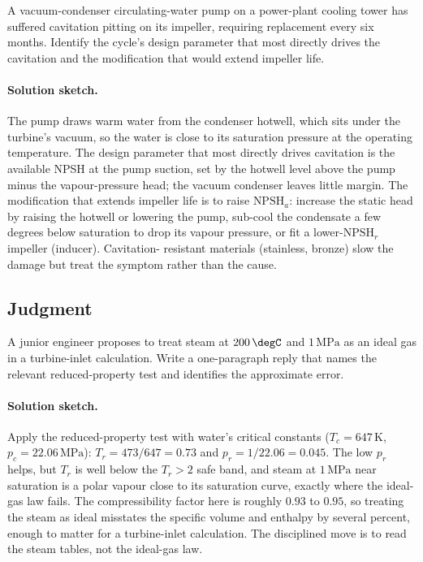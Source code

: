\begin{exercise}
A vacuum-condenser circulating-water pump on a power-plant cooling
tower has suffered cavitation pitting on its impeller, requiring
replacement every six months. Identify the cycle's design parameter
that most directly drives the cavitation and the modification that
would extend impeller life.

\paragraph{Solution sketch.} The pump draws warm water from the
condenser hotwell, which sits under the turbine's vacuum, so the water is
close to its saturation pressure at the operating temperature. The design
parameter that most directly drives cavitation is the available NPSH at
the pump suction, set by the hotwell level above the pump minus the
vapour-pressure head; the vacuum condenser leaves little margin. The
modification that extends impeller life is to raise $\text{NPSH}_a$:
increase the static head by raising the hotwell or lowering the pump,
sub-cool the condensate a few degrees below saturation to drop its vapour
pressure, or fit a lower-$\text{NPSH}_r$ impeller (inducer). Cavitation-
resistant materials (stainless, bronze) slow the damage but treat the
symptom rather than the cause.
\end{exercise}

\subsection*{Judgment}

\begin{exercise}
A junior engineer proposes to treat steam at $200\,\degC$ and
$1\,\text{MPa}$ as an ideal gas in a turbine-inlet calculation.
Write a one-paragraph reply that names the relevant reduced-property
test and identifies the approximate error.

\paragraph{Solution sketch.} Apply the reduced-property test with water's
critical constants ($T_c = 647\,\si{\kelvin}$, $p_c = 22.06\,\text{MPa}$):
$T_r = 473/647 = 0.73$ and $p_r = 1/22.06 = 0.045$. The low $p_r$ helps,
but $T_r$ is well below the $T_r > 2$ safe band, and steam at
$1\,\text{MPa}$ near saturation is a polar vapour close to its
saturation curve, exactly where the ideal-gas law fails. The
compressibility factor here is roughly $0.93$ to $0.95$, so treating the
steam as ideal misstates the specific volume and enthalpy by several
percent, enough to matter for a turbine-inlet calculation. The
disciplined move is to read the steam tables, not the ideal-gas law.
\end{exercise}

